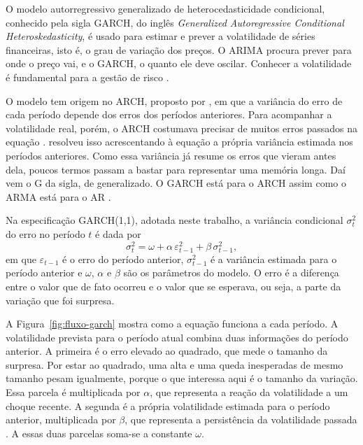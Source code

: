 O modelo autorregressivo generalizado de heterocedasticidade condicional,
conhecido pela sigla GARCH, do inglês \textit{Generalized Autoregressive
Conditional Heteroskedasticity}, é usado para estimar e prever a volatilidade de
séries financeiras, isto é, o grau de variação dos preços. O ARIMA procura prever
para onde o preço vai, e o GARCH, o quanto ele deve oscilar. Conhecer a
volatilidade é fundamental para a gestão de risco \cite{araya2024}.

O modelo tem origem no ARCH, proposto por , em que a
variância do erro de cada período depende dos erros dos períodos anteriores. Para
acompanhar a volatilidade real, porém, o ARCH costumava precisar de muitos erros
passados na equação \cite[p.~308]{bollerslev1986}. 
resolveu isso acrescentando à equação a própria variância estimada nos períodos
anteriores. Como essa variância já resume os erros que vieram antes dela, poucos
termos passam a bastar para representar uma memória longa. Daí vem o G da sigla,
de generalizado. O GARCH está para o ARCH assim como o ARMA está para o AR
\cite[p.~308]{bollerslev1986}.

Na especificação GARCH(1,1), adotada neste trabalho, a variância condicional
$\sigma^2_t$ do erro no período $t$ é dada por
\begin{equation*}
\sigma^2_t = \omega + \alpha\,\varepsilon^2_{t-1} + \beta\,\sigma^2_{t-1},
\end{equation*}
em que $\varepsilon_{t-1}$ é o erro do período anterior, $\sigma^2_{t-1}$ é a
variância estimada para o período anterior e $\omega$, $\alpha$ e $\beta$ são os
parâmetros do modelo. O erro é a diferença entre o valor que de fato ocorreu e o
valor que se esperava, ou seja, a parte da variação que foi surpresa.

A Figura~\ref{fig:fluxo-garch} mostra como a equação funciona a cada período. A
volatilidade prevista para o período atual combina duas informações do período
anterior. A primeira é o erro elevado ao quadrado, que mede o tamanho da surpresa.
Por estar ao quadrado, uma alta e uma queda inesperadas de mesmo tamanho pesam
igualmente, porque o que interessa aqui é o tamanho da variação. Essa parcela é
multiplicada por $\alpha$, que representa a reação da volatilidade a um choque
recente. A segunda é a própria volatilidade estimada para o período anterior,
multiplicada por $\beta$, que representa a persistência da volatilidade passada
\cite{bollerslev1986}. A essas duas parcelas soma-se a constante $\omega$.

